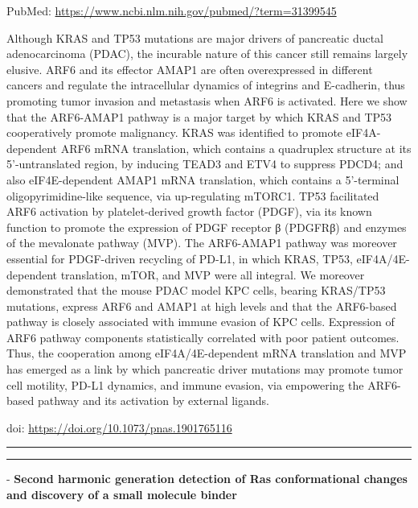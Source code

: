 \documentclass[]{article}
\begin{document}
PubMed: \url{https://www.ncbi.nlm.nih.gov/pubmed/?term=31399545}

Although KRAS and TP53 mutations are major drivers of pancreatic ductal
adenocarcinoma (PDAC), the incurable nature of this cancer still remains
largely elusive. ARF6 and its effector AMAP1 are often overexpressed in
different cancers and regulate the intracellular dynamics of integrins
and E-cadherin, thus promoting tumor invasion and metastasis when ARF6
is activated. Here we show that the ARF6-AMAP1 pathway is a major target
by which KRAS and TP53 cooperatively promote malignancy. KRAS was
identified to promote eIF4A-dependent ARF6 mRNA translation, which
contains a quadruplex structure at its 5'-untranslated region, by
inducing TEAD3 and ETV4 to suppress PDCD4; and also eIF4E-dependent
AMAP1 mRNA translation, which contains a 5'-terminal
oligopyrimidine-like sequence, via up-regulating mTORC1. TP53
facilitated ARF6 activation by platelet-derived growth factor (PDGF),
via its known function to promote the expression of PDGF receptor β
(PDGFRβ) and enzymes of the mevalonate pathway (MVP). The ARF6-AMAP1
pathway was moreover essential for PDGF-driven recycling of PD-L1, in
which KRAS, TP53, eIF4A/4E-dependent translation, mTOR, and MVP were all
integral. We moreover demonstrated that the mouse PDAC model KPC cells,
bearing KRAS/TP53 mutations, express ARF6 and AMAP1 at high levels and
that the ARF6-based pathway is closely associated with immune evasion of
KPC cells. Expression of ARF6 pathway components statistically
correlated with poor patient outcomes. Thus, the cooperation among
eIF4A/4E-dependent mRNA translation and MVP has emerged as a link by
which pancreatic driver mutations may promote tumor cell motility, PD-L1
dynamics, and immune evasion, via empowering the ARF6-based pathway and
its activation by external ligands.

doi: \url{https://doi.org/10.1073/pnas.1901765116}

{}

{}

\begin{center}\rule{0.5\linewidth}{\linethickness}\end{center}

\begin{center}\rule{0.5\linewidth}{\linethickness}\end{center}

 - \textbf{Second harmonic generation detection of Ras conformational
changes and discovery of a small molecule binder}
\end{document}

